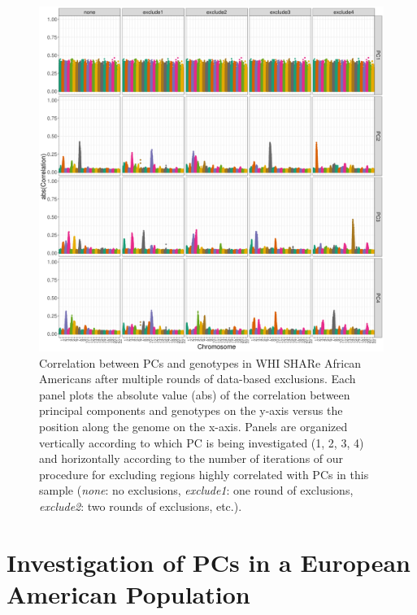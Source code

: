\documentclass[12pt]{article}
\begin{document}
\begin{figure}
\center
\includegraphics[width=\textwidth]{figs/pc_geno_corr/pc_geno_corr_compare_exclude}
\caption[Correlation between PCs and genotypes using a data-based filtering process.]{Correlation between PCs and genotypes in WHI SHARe African Americans after multiple rounds of data-based exclusions. Each panel plots the absolute value (abs) of the correlation between principal components and genotypes on the y-axis versus the position along the genome on the x-axis.  Panels are organized vertically according to which PC is being investigated (1, 2, 3, 4) and horizontally according to the number of iterations of our procedure for excluding regions highly correlated with PCs in this sample (\textit{none}: no exclusions, \textit{exclude1}: one round of exclusions, \textit{exclude2}: two rounds of exclusions, etc.).}
\label{fig:corr-compare-exclude}
\end{figure}



\newpage
\section{Investigation of PCs in a European American Population}
\end{document}
